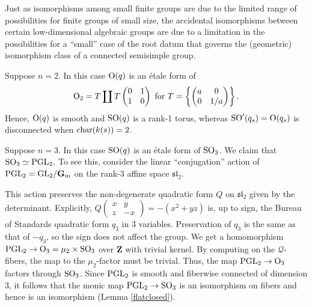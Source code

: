 \documentclass[10pt]{article}
\newcommand{\Q}{\mathscr{Q}}
\renewcommand{\(}{\left(}
\renewcommand{\)}{\right)}
\numberwithin{thm}{subsection}
\begin{document}
Just as isomorphisms among small finite groups are due to the limited range of possibilities
for finite groups of small size, the accidental isomorphisms between certain low-dimensional algebraic
groups are due to a limitation in the possibilities for a ``small'' case of the root datum
that governs the (geometric) isomorphism
class of a connected semisimple  group.  

\begin{ex}\label{so2}
Suppose $n = 2$.  In this case ${\rm{O}}(q)$ is an \'etale form of 
$${\rm{O}}_2 = T \coprod T \begin{pmatrix} 0 & 1 \\ 1 & 0 \end{pmatrix} \mbox{ for }
T = \left\{\begin{pmatrix} a & 0 \\ 0 & 1/a \end{pmatrix}\right\}.$$
Hence, ${\rm{O}}(q)$ is smooth and ${\rm{SO}}(q)$  is a rank-1 torus, 
whereas ${\rm{SO}}'(q_s) = {\rm{O}}(q_s)$ is disconnected when ${\rm{char}}(k(s)) = 2$.  
\end{ex}

\begin{ex}\label{so3}
Suppose $n = 3$.  In this case ${\rm{SO}}(q)$ is an \'etale form of ${\rm{SO}}_3$.
We claim that ${\rm{SO}}_3 \simeq {\rm{PGL}}_2$.
To see this, consider the linear ``conjugation'' action of 
${\rm{PGL}}_2 = {\rm{GL}}_2/{\mathbf{G}}_{\rm{m}}$ on the rank-3 affine space 
$\mathfrak{sl}_2$. 

This action preserves the non-degenerate  
quadratic form $Q$ on $\mathfrak{sl}_2$ given by the determinant.
Explicitly, $Q(\begin{smallmatrix} x & y \\ z & -x \end{smallmatrix})
= -(x^2 + yz)$ is, up to sign, the Bureau of Standards quadratic form $q_3$ in 3 variables.
Preservation of $q_3$ is the same as that of $-q_3$, so the sign does not affect the group. 
We get a homomorphism
${\rm{PGL}}_2 \rightarrow {\rm{O}}_3 = \mu_2 \times {\rm{SO}}_3$ 
over ${\mathbf{Z}}$ with trivial kernel. By computing on the $\Q$-fibers, 
the map to the $\mu_2$-factor must be trivial.  Thus, 
the map ${\rm{PGL}}_2 \rightarrow {\rm{O}}_3$ factors through 
${\rm{SO}}_3$. 
Since ${\rm{PGL}}_2$ is smooth and fiberwise connected of dimension 3, it follows that 
the monic map ${\rm{PGL}}_2 \rightarrow {\rm{SO}}_3$ is an isomorphism on fibers and hence
is an isomorphism (Lemma \ref{flatclosed}). 
\end{ex}
\end{document}
